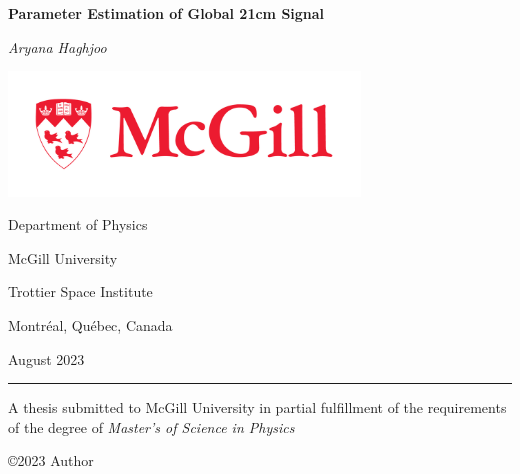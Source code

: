 \documentclass[12pt, TexShade, letterpaper]{report}
\author{\textcopyright Author, August, 2020}
\date{}
\renewcommand{\chaptermark}[1]{\markboth{#1}{}} %
\begin{document}
\begin{titlepage}
		\begin{center}
			\vspace*{0.5cm}

			\LARGE
			\textbf{Parameter Estimation of Global 21cm Signal}
			\vspace{0.5cm}
			
			\textit{Aryana Haghjoo}
			
			\vspace{1cm}
			
			\includegraphics[width=0.7\textwidth]{McGill_logo.png}
			
			\vspace{0.1cm}
			
			\Large
			Department of Physics
			
			\vspace{-6mm}
			McGill University
			
			\vspace{-6mm}
			Trottier Space Institute
			
			\vspace{-6mm}
			Montr\'eal, Qu\'ebec, Canada
			
			\vspace{5mm}
			August 2023
			\small
			\vspace{1cm}
			{\color{red} \hrule height 0.75mm}
			
			\vspace{0.2cm}
			
			A thesis submitted to McGill University in partial fulfillment of the requirements of the degree of
			\emph{Master's of Science in Physics}
		
			\copyright\hspace{0.5mm}2023 Author
			
		\end{center}
	\end{titlepage}
\setlength{\voffset}{2cm}
\renewcommand{\chaptermark}[1]{%
	\markboth{\thechapter.\ #1}{}}
\end{document}
